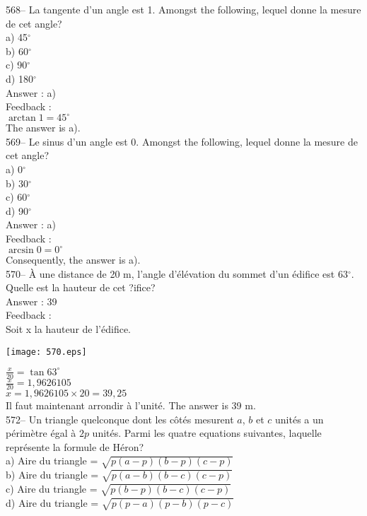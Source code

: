 ﻿\documentclass[letterpaper, 12pt]{article}
\begin{document}
568-- La tangente d'un angle est 1.  Amongst the following, lequel
donne la mesure de cet angle?\\
a) 45$^{\circ}$\\
b) 60$^{\circ}$\\
c) 90$^{\circ}$\\
d) 180$^{\circ}$\\

Answer : a)\\

Feedback : \\
$\arctan 1 = 45^{\circ}$\\
The answer is a).\\

569-- Le sinus d'un angle est 0.  Amongst the following, lequel
donne la mesure de cet angle?\\
a) 0$^{\circ}$\\
b) 30$^{\circ}$\\
c) 60$^{\circ}$\\
d) 90$^{\circ}$\\

Answer : a)\\

Feedback : \\
$\arcsin 0 = 0^{\circ}$\\
Consequently, the answer is a).\\

570-- \`A une distance de 20 m, l'angle d'\'el\'evation du sommet d'un
\'edifice est 63$^{\circ}$. Quelle est la hauteur de cet ?ifice?\\

Answer : 39  \\

Feedback : \\
Soit x la hauteur de l'\'edifice.\\[2mm]   \begin{center}
    \texttt{[image: 570.eps]}
    \end{center}
$\frac{x}{20}=\tan 63^{\circ}$\\[2mm]
$\frac{x}{20}=1,9626105$\\[2mm]
$x=1,9626105\times20=39,25$\\[2mm]
Il faut maintenant arrondir \`a l'unit\'e.
The answer is 39 m.\\



572-- Un triangle quelconque dont les c\^ot\'es mesurent $a$, $b$ et $c$
unit\'es a un p\'erim\`etre \'egal \`a $2p$ unit\'es.  Parmi les quatre
equations suivantes, laquelle repr\'esente la formule de H\'eron?\\
a) Aire du triangle = $\sqrt{p\left( a-p\right) \left( b-p\right) \left(
c-p\right) }$\\[2mm]
b) Aire du triangle = $\sqrt{p\left( a-b\right) \left( b-c\right) \left(
c-p\right) }$\\[2mm]
c) Aire du triangle = $\sqrt{p\left( b-p\right) \left( b-c\right) \left(
c-p\right) }$\\[2mm]
d) Aire du triangle = $\sqrt{p\left( p-a\right) \left( p-b\right) \left(
p-c\right) }$\\
\end{document}
